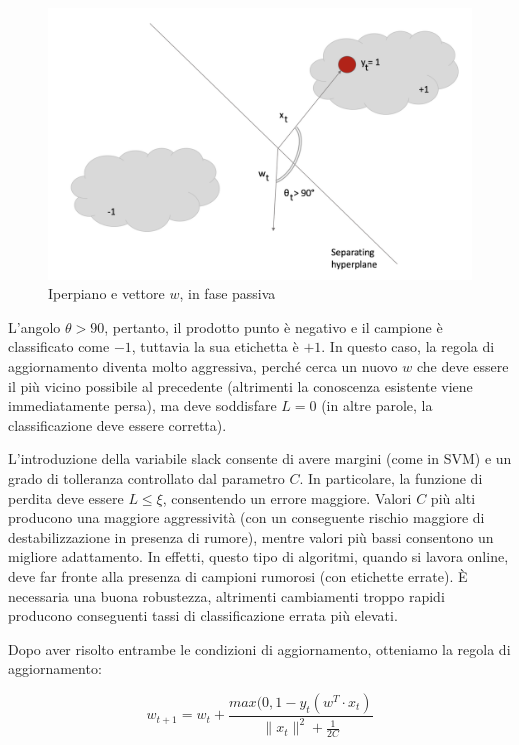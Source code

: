 \begin{figure}[h]
    \centering
    \includegraphics[scale=0.5]{Figure/PAII1.png}
    \caption{Iperpiano e vettore $w$, in fase passiva}
    \label{fig:PAII1}
\end{figure}
\FloatBarrier  

L'angolo $\theta> 90$, pertanto, il prodotto punto è negativo e il campione è classificato come $-1$, tuttavia la sua etichetta è $+1$. In questo caso, la regola di aggiornamento diventa molto aggressiva, perché cerca un nuovo $w$ che deve essere il più vicino possibile al precedente (altrimenti la conoscenza esistente viene immediatamente persa), ma deve soddisfare $L = 0$ (in altre parole, la classificazione deve essere corretta).

L'introduzione della variabile slack consente di avere margini  (come in SVM) e un grado di tolleranza controllato dal parametro $C$. In particolare, la funzione di perdita deve essere $L \leq \xi$, consentendo un errore maggiore. Valori $C$ più alti producono una maggiore aggressività (con un conseguente rischio maggiore di destabilizzazione in presenza di rumore), mentre valori più bassi consentono un migliore adattamento. In effetti, questo tipo di algoritmi, quando si lavora online, deve far fronte alla presenza di campioni rumorosi (con etichette errate). È necessaria una buona robustezza, altrimenti cambiamenti troppo rapidi producono conseguenti tassi di classificazione errata più elevati.

Dopo aver risolto entrambe le condizioni di aggiornamento, otteniamo la regola di aggiornamento:

$$w_{t+1}=w_t+\frac{max(0,1-y_t(w^T\cdot x_t)}{\|x_t\|^2+\frac{1}{2C}}$$ 

